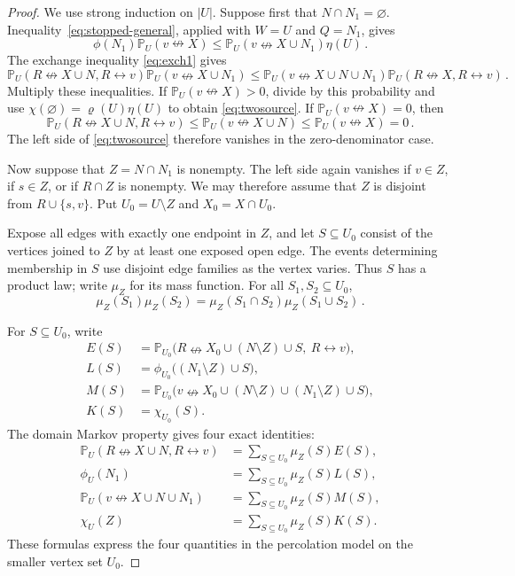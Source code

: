 \documentclass[11pt]{article}
\theoremstyle{definition}
\theoremstyle{remark}
\newcommand{\PP}{\mathbb P}
\newcommand{\con}{\leftrightarrow}
\newcommand{\ncon}{\nleftrightarrow}
\begin{document}
\begin{proof}
We use strong induction on $|U|$. Suppose first that $N\cap N_1=\varnothing$.
Inequality~\eqref{eq:stopped-general}, applied with $W=U$ and $Q=N_1$, gives
\[
 \phi(N_1)\PP_U(v\ncon X)
 \leq \PP_U(v\ncon X\cup N_1)\eta(U)\,.
\]
The exchange inequality \eqref{eq:exch1} gives
\[
 \PP_U(R\ncon X\cup N,R\con v)\PP_U(v\ncon X\cup N_1)
 \leq
 \PP_U(v\ncon X\cup N\cup N_1)\PP_U(R\ncon X,R\con v)\,.
\]
Multiply these inequalities. If $\PP_U(v\ncon X)>0$, divide by this probability and use
$\chi(\varnothing)=\varrho(U)\eta(U)$ to obtain \eqref{eq:twosource}. If
$\PP_U(v\ncon X)=0$, then
\[
 \PP_U(R\ncon X\cup N,R\con v)
 \leq \PP_U(v\ncon X\cup N)
 \leq \PP_U(v\ncon X)=0\,.
\]
The left side of \eqref{eq:twosource} therefore vanishes in the zero-denominator case.

Now suppose that $Z=N\cap N_1$ is nonempty. The left side again vanishes if $v\in Z$, if
$s\in Z$, or if $R\cap Z$ is nonempty. We may therefore assume that $Z$ is disjoint from
$R\cup\{s,v\}$. Put $U_0=U\setminus Z$ and $X_0=X\cap U_0$.

Expose all edges with exactly one endpoint in $Z$, and let $S\subseteq U_0$ consist of the
vertices joined to $Z$ by at least one exposed open edge. The events determining
membership in $S$ use disjoint edge families as the vertex varies. Thus $S$ has a product law; write
$\mu_Z$ for its mass function. For all $S_1,S_2\subseteq U_0$,
\begin{equation}\label{eq:product-neighbour-law}
 \mu_Z(S_1)\mu_Z(S_2)
 =\mu_Z(S_1\cap S_2)\mu_Z(S_1\cup S_2)\,.
\end{equation}

For $S\subseteq U_0$, write
\[
 \begin{aligned}
 E(S)&=\PP_{U_0}\bigl(R\ncon X_0\cup(N\setminus Z)\cup S,\ R\con v\bigr),\\
 L(S)&=\phi_{U_0}\bigl((N_1\setminus Z)\cup S\bigr),\\
 M(S)&=\PP_{U_0}\bigl(v\ncon
       X_0\cup(N\setminus Z)\cup(N_1\setminus Z)\cup S\bigr),\\
 K(S)&=\chi_{U_0}(S).
 \end{aligned}
\]
The domain Markov property gives four exact identities:
\[
 \begin{aligned}
 \PP_U(R\ncon X\cup N,R\con v)&=\sum_{S\subseteq U_0}\mu_Z(S)E(S),\\
 \phi_U(N_1)&=\sum_{S\subseteq U_0}\mu_Z(S)L(S),\\
 \PP_U(v\ncon X\cup N\cup N_1)&=\sum_{S\subseteq U_0}\mu_Z(S)M(S),\\
 \chi_U(Z)&=\sum_{S\subseteq U_0}\mu_Z(S)K(S).
 \end{aligned}
\]
These formulas express the four quantities in the percolation model on the smaller vertex
set $U_0$.


\end{proof}
\end{document}
